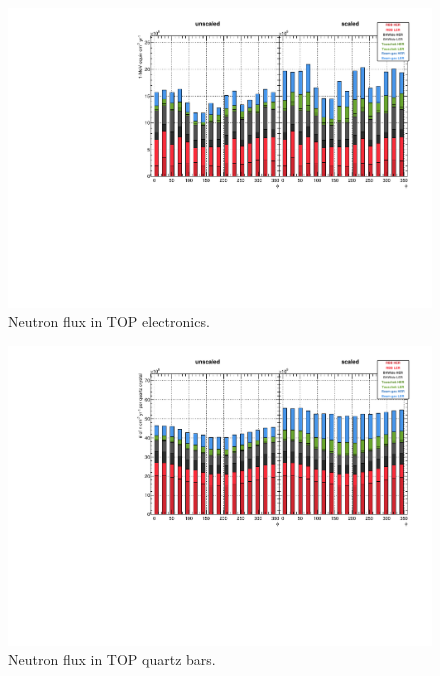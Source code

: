 \begin{figure}[htb]
	\centerfloat
		\includegraphics[width=\textwidth]{images/hTOPFlux}
	\caption[Neutron flux in TOP electronics]{Neutron flux in TOP electronics.}	
	\label{fig:TOPFlux}
\end{figure}

\begin{figure}[htb]
	\centerfloat
		\includegraphics[width=\textwidth]{images/hTOPFluxBar}
	\caption[Neutron flux in TOP quartz bars]{Neutron flux in TOP quartz bars.}	
	\label{fig:TOPBARFlux}
\end{figure}

